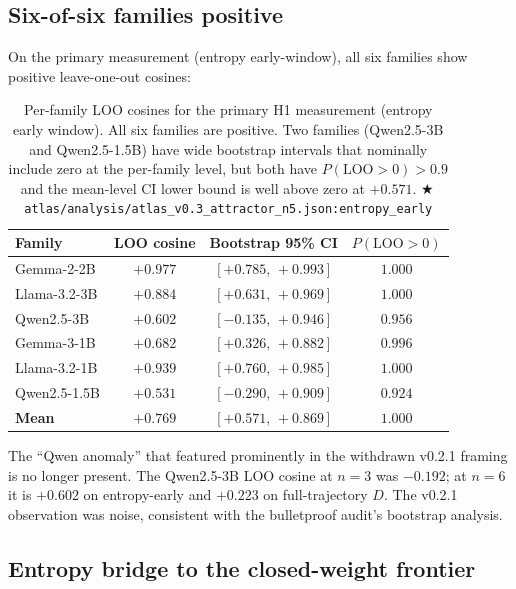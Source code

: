 \documentclass[11pt,letterpaper]{article}
\newcommand{\repro}[1]{%
  \textcolor{fathomgreen}{\footnotesize$\bigstar$\,\texttt{#1}}}
\begin{document}
\subsection{Six-of-six families positive}

On the primary measurement (entropy early-window), all six families show
positive leave-one-out cosines:

\begin{table}[h]
\centering
\small
\begin{tabular}{lccc}
\toprule
Family & LOO cosine & Bootstrap 95\% CI & $P(\text{LOO}>0)$ \\
\midrule
Gemma-2-2B   & $+0.977$ & $[+0.785,\,+0.993]$ & $1.000$ \\
Llama-3.2-3B & $+0.884$ & $[+0.631,\,+0.969]$ & $1.000$ \\
Qwen2.5-3B   & $+0.602$ & $[-0.135,\,+0.946]$ & $0.956$ \\
Gemma-3-1B   & $+0.682$ & $[+0.326,\,+0.882]$ & $0.996$ \\
Llama-3.2-1B & $+0.939$ & $[+0.760,\,+0.985]$ & $1.000$ \\
Qwen2.5-1.5B & $+0.531$ & $[-0.290,\,+0.909]$ & $0.924$ \\
\midrule
\textbf{Mean} & $\mathbf{+0.769}$ & $\mathbf{[+0.571,\,+0.869]}$ & $\mathbf{1.000}$ \\
\bottomrule
\end{tabular}
\caption{Per-family LOO cosines for the primary H1 measurement (entropy
early window). All six families are positive. Two families (Qwen2.5-3B
and Qwen2.5-1.5B) have wide bootstrap intervals that nominally include
zero at the per-family level, but both have $P(\text{LOO}>0)>0.9$ and the
mean-level CI lower bound is well above zero at $+0.571$.
\repro{atlas/analysis/atlas\_v0.3\_attractor\_n5.json:entropy\_early}}
\label{tab:perfam}
\end{table}

The ``Qwen anomaly'' that featured prominently in the withdrawn v0.2.1
framing is no longer present. The Qwen2.5-3B LOO cosine at $n\!=\!3$ was
$-0.192$; at $n\!=\!6$ it is $+0.602$ on entropy-early and $+0.223$ on
full-trajectory $D$. The v0.2.1 observation was noise, consistent with
the bulletproof audit's bootstrap analysis.

\subsection{Entropy bridge to the closed-weight frontier}
\end{document}
